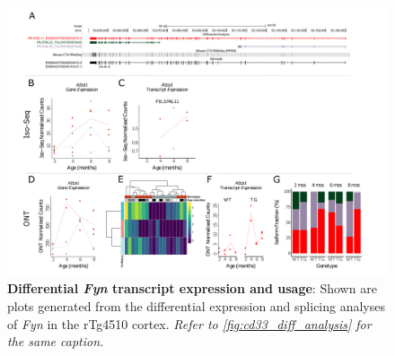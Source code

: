 \begin{landscape}
	\begin{figure}[htp]
		\begin{center}
			\includegraphics[page=10,trim={0 0.5cm 0 1.5cm},scale =0.85]{Figures/TargetGene_DifferentialAnalysis.pdf}
		\end{center}
		\captionsetup{width=1.5\textwidth}
		\caption[Differential \textit{Fyn} transcript expression and usage]%
		{\textbf{Differential \textit{Fyn} transcript expression and usage}: Shown are plots generated from the differential expression and splicing analyses of \textit{Fyn} in the rTg4510 cortex. \textit{Refer to \cref{fig:cd33_diff_analysis} for the same caption.}}   
		\label{fig:Fyn_diff_analysis}
	\end{figure}
\end{landscape}

